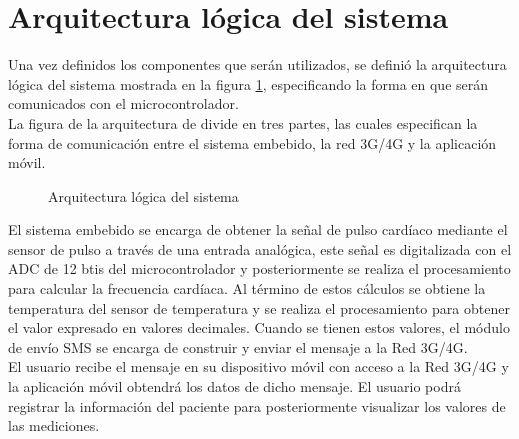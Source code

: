 \section{Arquitectura lógica del sistema}
Una vez definidos los componentes que serán utilizados, se definió la arquitectura lógica del sistema mostrada en la figura \ref{fig:DisenoArquiLogica}, especificando la forma en que serán comunicados con el microcontrolador.\\

La figura de la arquitectura de divide en tres partes, las cuales especifican la forma de comunicación entre el sistema embebido, la red 3G/4G y la aplicación móvil.\\

\begin{figure}[htbp!]
	\centering
	\caption{Arquitectura lógica del sistema}
	\label{fig:DisenoArquiLogica}
\end{figure}

El sistema embebido se encarga de obtener la señal de pulso cardíaco mediante el sensor de pulso a través de una entrada analógica, este señal es digitalizada con el ADC de 12 btis del microcontrolador y posteriormente se realiza el procesamiento para calcular la frecuencia cardíaca. Al término de estos cálculos se obtiene la temperatura del sensor de temperatura y se realiza el procesamiento para obtener el valor expresado en valores decimales. Cuando se tienen estos valores, el módulo de envío SMS se encarga de construir y enviar el mensaje a la Red 3G/4G. \\

El usuario recibe el mensaje en su dispositivo móvil con acceso a la Red 3G/4G y la aplicación móvil obtendrá los datos de dicho mensaje. El usuario podrá registrar la información del paciente para posteriormente visualizar los valores de las mediciones.